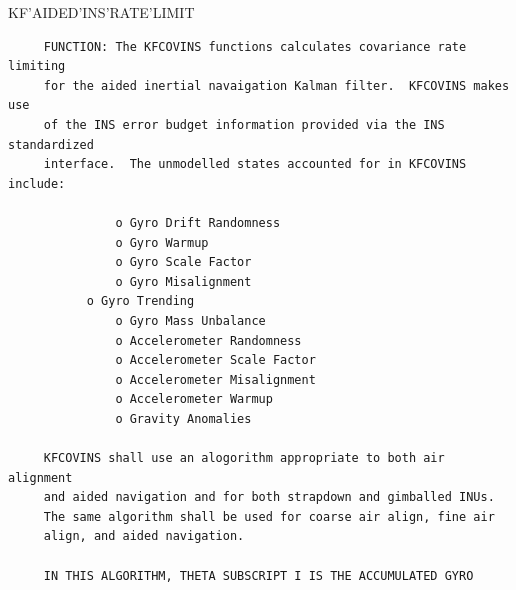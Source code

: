 \begin{frame}
KF'AIDED'INS'RATE'LIMIT
\begin{verbatim}
     FUNCTION: The KFCOVINS functions calculates covariance rate limiting
     for the aided inertial navaigation Kalman filter.  KFCOVINS makes use
     of the INS error budget information provided via the INS standardized
     interface.  The unmodelled states accounted for in KFCOVINS include:

               o Gyro Drift Randomness
               o Gyro Warmup
               o Gyro Scale Factor
               o Gyro Misalignment
	       o Gyro Trending
               o Gyro Mass Unbalance
               o Accelerometer Randomness
               o Accelerometer Scale Factor
               o Accelerometer Misalignment
               o Accelerometer Warmup
               o Gravity Anomalies

     KFCOVINS shall use an alogorithm appropriate to both air alignment
     and aided navigation and for both strapdown and gimballed INUs.
     The same algorithm shall be used for coarse air align, fine air
     align, and aided navigation.

     IN THIS ALGORITHM, THETA SUBSCRIPT I IS THE ACCUMULATED GYRO

\end{verbatim}
\end{frame}
